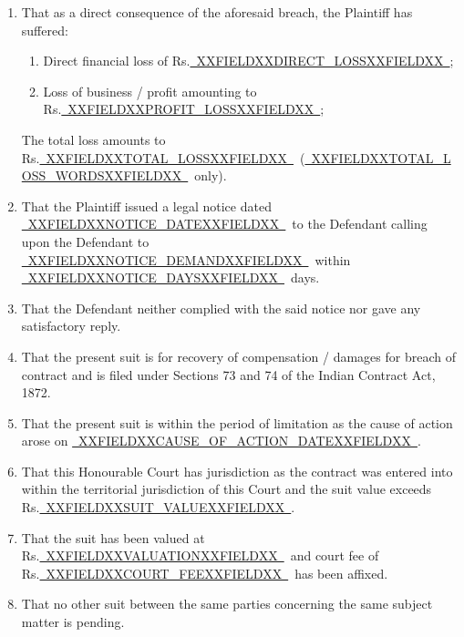 \documentclass[12pt,a4paper]{article}
\newcommand{\fillline}[1]{\underline{~#1~}}
\begin{document}
\begin{enumerate}[leftmargin=*, label=\arabic{enumi}., itemsep=10pt, topsep=4pt]
  \item That as a direct consequence of the aforesaid breach, the Plaintiff has suffered:
        \begin{enumerate}[label=(\alph*), itemsep=4pt]
          \item Direct financial loss of Rs.\fillline{XXFIELDXXDIRECT_LOSSXXFIELDXX};
          \item Loss of business / profit amounting to Rs.\fillline{XXFIELDXXPROFIT_LOSSXXFIELDXX};
        \end{enumerate}
        The total loss amounts to Rs.\fillline{XXFIELDXXTOTAL_LOSSXXFIELDXX}\ (\fillline{XXFIELDXXTOTAL_LOSS_WORDSXXFIELDXX}\ only).

  \item That the Plaintiff issued a legal notice dated \fillline{XXFIELDXXNOTICE_DATEXXFIELDXX}\ to the Defendant
        calling upon the Defendant to \fillline{XXFIELDXXNOTICE_DEMANDXXFIELDXX}\ within \fillline{XXFIELDXXNOTICE_DAYSXXFIELDXX}\ days.

  \item That the Defendant neither complied with the said notice nor gave any satisfactory reply.

  \item That the present suit is for recovery of compensation / damages for breach of contract
        and is filed under Sections 73 and 74 of the Indian Contract Act, 1872.

  \item That the present suit is within the period of limitation as the cause of action arose
        on \fillline{XXFIELDXXCAUSE_OF_ACTION_DATEXXFIELDXX}.

  \item That this Honourable Court has jurisdiction as the contract was entered into within
        the territorial jurisdiction of this Court and the suit value exceeds Rs.\fillline{XXFIELDXXSUIT_VALUEXXFIELDXX}.

  \item That the suit has been valued at Rs.\fillline{XXFIELDXXVALUATIONXXFIELDXX}\ and court fee of
        Rs.\fillline{XXFIELDXXCOURT_FEEXXFIELDXX}\ has been affixed.

  \item That no other suit between the same parties concerning the same subject matter is pending.

\end{enumerate}

\vspace{14pt}
\end{document}
